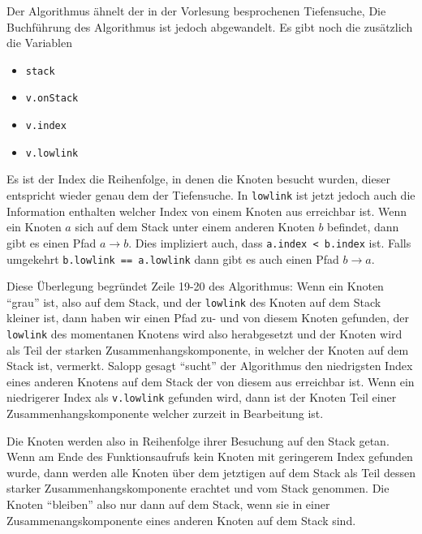 \documentclass[11pt]{article}
\begin{document}
\begin{enumerate}[a)]
\begin{enumerate}[a)]
        Der Algorithmus \"ahnelt der in der Vorlesung besprochenen Tiefensuche,
        Die Buchf\"uhrung des Algorithmus ist jedoch abgewandelt. Es gibt noch
        die zus\"atzlich die Variablen
        \begin{itemize}
          \item \texttt{stack}
          \item \texttt{v.onStack}
          \item \texttt{v.index}
          \item \texttt{v.lowlink}
        \end{itemize}
        Es ist der Index die Reihenfolge, in denen die
        Knoten besucht wurden, dieser entspricht wieder genau dem der Tiefensuche.
        In \texttt{lowlink} ist jetzt jedoch auch die Information enthalten
        welcher Index von einem Knoten aus erreichbar ist. Wenn ein Knoten $a$
        sich auf dem Stack unter einem anderen Knoten $b$ befindet, dann gibt
        es einen Pfad $a \to b$. Dies impliziert auch, dass \texttt{a.index <
        b.index} ist.  Falls umgekehrt \texttt{b.lowlink  == a.lowlink} dann
        gibt es auch einen Pfad $b \to a$.

        Diese \"Uberlegung begr\"undet Zeile 19-20 des Algorithmus: Wenn
        ein Knoten ``grau'' ist, also auf dem Stack, und der \texttt{lowlink}
        des Knoten auf dem Stack kleiner ist, dann haben wir einen Pfad zu-
        und von diesem Knoten gefunden, der \texttt{lowlink} des 
        momentanen Knotens wird also herabgesetzt und der Knoten wird
        als Teil der starken Zusammenhangskomponente, in welcher der Knoten
        auf dem Stack ist, vermerkt. Salopp gesagt ``sucht'' der Algorithmus
        den niedrigsten Index eines anderen Knotens auf dem Stack der von
        diesem aus erreichbar ist. Wenn ein niedrigerer Index als
        \texttt{v.lowlink} gefunden wird, dann ist der Knoten Teil einer
        Zusammenhangskomponente welcher zurzeit in Bearbeitung ist.

        Die Knoten werden also in Reihenfolge ihrer Besuchung auf den Stack
        getan. Wenn am Ende des Funktionsaufrufs kein Knoten mit
        geringerem Index gefunden wurde, dann werden alle Knoten \"uber
        dem jetztigen auf dem Stack als Teil dessen starker
        Zusammenhangskomponente erachtet und vom Stack genommen. Die Knoten
        ``bleiben'' also nur dann auf dem Stack, wenn sie in einer
        Zusammenangskomponente eines anderen Knoten auf dem Stack sind.
        

\end{enumerate}
\end{enumerate}
\end{document}
